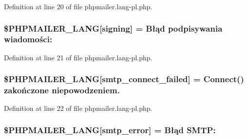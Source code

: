 Definition at line 20 of file phpmailer.\+lang-\/pl.\+php.

\subsubsection[{\texorpdfstring{\$\+P\+H\+P\+M\+A\+I\+L\+E\+R\+\_\+\+L\+A\+NG}{$PHPMAILER_LANG}}]{\setlength{\rightskip}{0pt plus 5cm}\$P\+H\+P\+M\+A\+I\+L\+E\+R\+\_\+\+L\+A\+NG\mbox{[}\textquotesingle{}signing\textquotesingle{}\mbox{]} = \textquotesingle{}Błąd podpisywania wiadomości\+: \textquotesingle{}}\hypertarget{phpmailer_8lang-pl_8php_a68e437bdb9b968a5a67320f03d231565}{}\label{phpmailer_8lang-pl_8php_a68e437bdb9b968a5a67320f03d231565}


Definition at line 21 of file phpmailer.\+lang-\/pl.\+php.

\subsubsection[{\texorpdfstring{\$\+P\+H\+P\+M\+A\+I\+L\+E\+R\+\_\+\+L\+A\+NG}{$PHPMAILER_LANG}}]{\setlength{\rightskip}{0pt plus 5cm}\$P\+H\+P\+M\+A\+I\+L\+E\+R\+\_\+\+L\+A\+NG\mbox{[}\textquotesingle{}smtp\+\_\+connect\+\_\+failed\textquotesingle{}\mbox{]} =  Connect() zakończone niepowodzeniem.\textquotesingle{}}\hypertarget{phpmailer_8lang-pl_8php_a7b321d4ca1e9df702403ed4c61aa0980}{}\label{phpmailer_8lang-pl_8php_a7b321d4ca1e9df702403ed4c61aa0980}


Definition at line 22 of file phpmailer.\+lang-\/pl.\+php.

\subsubsection[{\texorpdfstring{\$\+P\+H\+P\+M\+A\+I\+L\+E\+R\+\_\+\+L\+A\+NG}{$PHPMAILER_LANG}}]{\setlength{\rightskip}{0pt plus 5cm}\$P\+H\+P\+M\+A\+I\+L\+E\+R\+\_\+\+L\+A\+NG\mbox{[}\textquotesingle{}smtp\+\_\+error\textquotesingle{}\mbox{]} = \textquotesingle{}Błąd S\+M\+T\+P\+: \textquotesingle{}}\hypertarget{phpmailer_8lang-pl_8php_a7d9cffba1e669c845f8a4c891ee50064}{}\label{phpmailer_8lang-pl_8php_a7d9cffba1e669c845f8a4c891ee50064}


